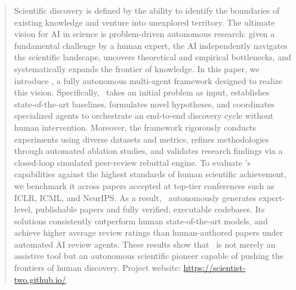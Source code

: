 \begin{abstract}
Scientific discovery is defined by the ability to identify the boundaries of existing knowledge and venture into unexplored territory. The ultimate vision for AI in science is problem-driven autonomous research: given a fundamental challenge by a human expert, the AI independently navigates the scientific landscape, uncovers theoretical and empirical bottlenecks, and systematically expands the frontier of knowledge. In this paper, we introduce \emph{\sname}, a fully autonomous multi-agent framework designed to realize this vision. Specifically, \sname~takes an initial problem as input, establishes state-of-the-art baselines, formulates novel hypotheses, and coordinates specialized agents to orchestrate an end-to-end discovery cycle without human intervention. Moreover, the framework rigorously conducts experiments using diverse datasets and metrics, refines methodologies through automated ablation studies, and validates research findings via a closed-loop simulated peer-review rebuttal engine. To evaluate \sname's capabilities against the highest standards of human scientific achievement, we benchmark it across papers accepted at top-tier conferences such as ICLR, ICML, and NeurIPS. As a result, \sname~autonomously generates expert-level, publishable papers and fully verified, executable codebases.
Its solutions consistently outperform human state-of-the-art models, and achieve higher average review ratings than human-authored papers under automated AI review agents. These results show that \sname~is not merely an assistive tool but an autonomous scientific pioneer capable of pushing the frontiers of human discovery. Project website: \url{https://scientist-two.github.io/}
\end{abstract}